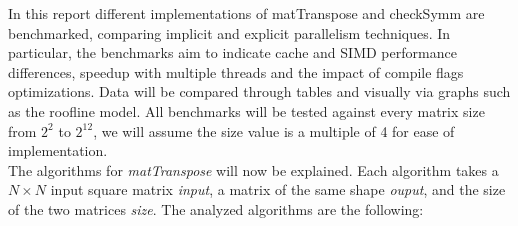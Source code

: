 \documentclass[conference]{IEEEtran}
\begin{document}
\iffalse %
    \begin{algorithmic}[1]
      \Procedure{MyProcedure}{}
      \EndProcedure
    \end{algorithmic}
\fi 

In this report different implementations of matTranspose
and checkSymm are benchmarked, comparing implicit and explicit parallelism
techniques. In particular, the benchmarks aim to indicate cache and SIMD performance differences,
speedup with multiple threads and the impact of compile flags optimizations. Data will be compared through tables
and visually via graphs such as the roofline model. All benchmarks
will be tested against every matrix size from $2^2$ to $2^{12}$, we will assume the size value is a multiple of 4 for ease of implementation.  \\
The algorithms for \textit{matTranspose} will now be explained.
Each algorithm takes a $N \times N$ input square matrix \textit{input}, a matrix of the same shape \textit{ouput}, and the size of the two matrices \textit{size}.
The analyzed algorithms are the following:
\end{document}
